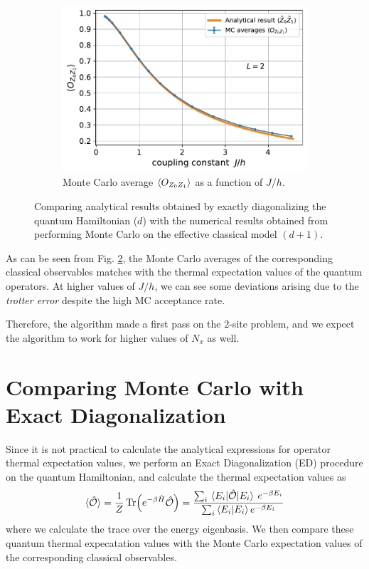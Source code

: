\documentclass[../thesis_main.tex]{subfiles}
\begin{document}
\begin{figure}[!htb]\ContinuedFloat
    \centering
    \begin{subfigure}[b]{0.6\textwidth}  %
        \centering
        \includegraphics[width=\textwidth]{images/2_site/O_Z0Z1.pdf}
        \caption{Monte Carlo average $\expval{O_{Z_0 Z_1}}$ as a function of $J/h$.}
        \label{expval_O_ZZ_vs_J/h_2}
    \end{subfigure}
    \caption{Comparing analytical results obtained by exactly diagonalizing the quantum Hamiltonian ($d$)  with the numerical results obtained from performing Monte Carlo on the effective classical model $(d+1)$.}
    \label{expval_O_vs_J/h_2}
\end{figure}
\FloatBarrier
As can be seen from Fig. \ref{expval_O_vs_J/h_2}, the Monte Carlo averages of the corresponding classical observables matches with the thermal expectation values of the quantum operators. At higher values of $J/h$, we can see some deviations arising due to the \textit{trotter error} despite the high MC acceptance rate.

Therefore, the algorithm made a first pass on the $2$-site problem, and we expect the algorithm to work for higher values of $N_x$ as well.   

\section{Comparing Monte Carlo with Exact Diagonalization}
Since it is not practical to calculate the analytical expressions for operator thermal expectation values, we perform an Exact Diagonalization (ED) procedure on the quantum Hamiltonian, and calculate the thermal expectation values as 
\begin{equation*}
    \langle \hat{\mathcal{O}} \rangle =  \frac{1}{Z} \Tr(e^{-\beta \hat{H}} \hat{\mathcal{O}}) = \frac{\sum_{i} \mel{E_i}{\hat{\mathcal{O}}}{E_i} \: e^{-\beta E_i}}{\sum_i \braket{E_i}{E_i} e^{-\beta E_i}}
\end{equation*}
where we calculate the trace over the energy eigenbasis. We then compare these quantum thermal expecatation values with the Monte Carlo expectation values of the corresponding classical observables.
\end{document}
